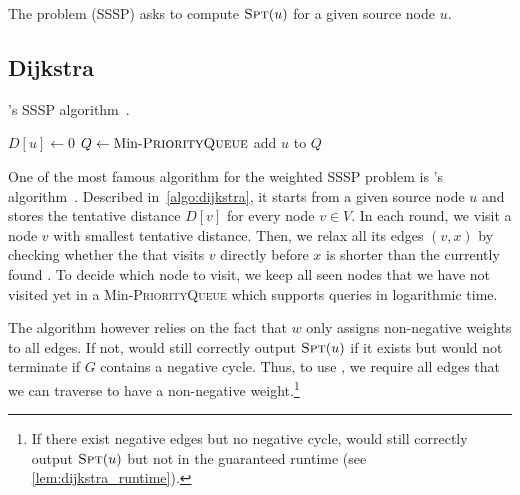 \begin{definition}
  The \sssp problem (SSSP) asks to compute $\textsc{Spt}(u)$ for a given source node $u$.
\end{definition}


\subsection{Dijkstra}

\begin{algorithm}[!tb]
  \caption{
    \algdk's SSSP algorithm~\cite{DBLP:journals/nm/Dijkstra59}.
  }
  \label{algo:dijkstra}


  \BlankLine
  $D[u] \gets 0$\;
  \BlankLine
  $Q \gets \text{Min-}\textsc{PriorityQueue}$\;
  add $u$ to $Q$\;
  \;
\end{algorithm}


One of the most famous algorithm for the weighted SSSP problem is \algdk's algorithm~\cite{DBLP:journals/nm/Dijkstra59}.
Described in~\cref{algo:dijkstra}, it starts from a given source node $u$ and stores the tentative distance $D[v]$ for every node $v \in V$.
In each round, we visit a node $v$ with smallest tentative distance. 
Then, we relax all its edges $(v, x)$ by checking whether the  that visits $v$ directly before $x$ is shorter than the currently found .
To decide which node to visit, we keep all seen nodes that we have not visited yet in a Min-\textsc{PriorityQueue} which supports queries in logarithmic time.

The algorithm however relies on the fact that $w$ only assigns non-negative weights to all edges. 
If not, \algdk would still correctly output $\textsc{Spt}(u)$ if it exists but would not terminate if $G$ contains a negative cycle.
Thus, to use \algdk, we require all edges that we can traverse to have a non-negative weight.\footnote{
  If there exist negative edges but no negative cycle, \algdk would still correctly output $\textsc{Spt}(u)$ but not in the guaranteed runtime (see \cref{lem:dijkstra_runtime}).
}

